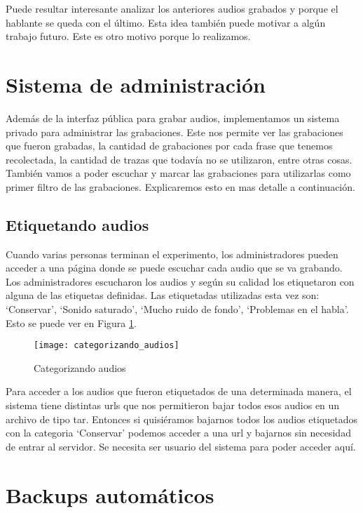 Puede resultar interesante analizar los anteriores audios grabados y porque el hablante se queda con el último. Esta idea también puede motivar a algún trabajo futuro. Este es otro motivo porque lo realizamos.

\section{Sistema de administración}

Además de la interfaz pública para grabar audios, implementamos un sistema privado para administrar las grabaciones. Este nos permite ver las grabaciones que fueron grabadas, la cantidad de grabaciones por cada frase que tenemos recolectada, la cantidad de trazas que todavía no se utilizaron, entre otras cosas. También vamos a poder escuchar y marcar las grabaciones para utilizarlas como primer filtro de las grabaciones. Explicaremos esto en mas detalle a continuación.

\subsection{Etiquetando audios}

Cuando varias personas terminan el experimento, los administradores pueden acceder a una página donde se puede escuchar cada audio que se va grabando. Los administradores escucharon los audios y según su calidad los etiquetaron con alguna de las etiquetas definidas. Las etiquetadas utilizadas esta vez son: `Conservar’,  `Sonido saturado’, `Mucho ruido de fondo’, `Problemas en el habla’. Esto se puede ver en Figura \ref{cat}.

\begin{figure}[h!]
    \centerline{\texttt{[image: categorizando\_audios]} }
    \caption{Categorizando audios}
    \label{cat}
\end{figure}

Para acceder a los audios que fueron etiquetados de una determinada manera, el sistema tiene distintas urls que nos permitieron bajar todos esos audios en un archivo de tipo tar. Entonces si quisiéramos bajarnos todos los audios etiquetados con la categoria `Conservar’ podemos acceder a una url y bajarnos sin necesidad de entrar al servidor. Se necesita ser usuario del sistema para poder acceder aquí.

\section{Backups automáticos}

